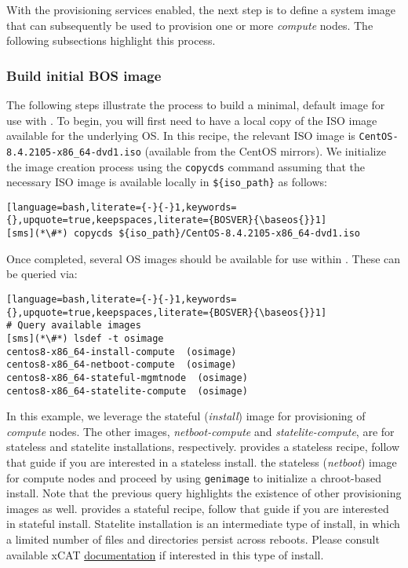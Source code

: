 
With the provisioning services enabled, the next step is to define
a system image that can subsequently be
used to provision one or more {\em compute} nodes. The following subsections highlight this process.

\subsubsection{Build initial BOS image} \label{sec:assemble_bos}
The following steps illustrate the process to build a minimal, default image for use with \xCAT{}. To begin, you will
first need to have a local copy of the ISO image available for the underlying OS. In this recipe, the relevant ISO image
is \texttt{CentOS-8.4.2105-x86\_64-dvd1.iso} (available from the CentOS mirrors). We initialize the image
creation process using the \texttt{copycds} command assuming that the necessary ISO image is available locally in
\texttt{\$\{iso\_path\}} as follows:

\begin{lstlisting}[language=bash,literate={-}{-}1,keywords={},upquote=true,keepspaces,literate={BOSVER}{\baseos{}}1]
[sms](*\#*) copycds ${iso_path}/CentOS-8.4.2105-x86_64-dvd1.iso
\end{lstlisting}

\noindent Once completed, several OS images should be available for use within \xCAT{}. These can be queried via:

\begin{lstlisting}[language=bash,literate={-}{-}1,keywords={},upquote=true,keepspaces,literate={BOSVER}{\baseos{}}1]
# Query available images
[sms](*\#*) lsdef -t osimage
centos8-x86_64-install-compute  (osimage)
centos8-x86_64-netboot-compute  (osimage)
centos8-x86_64-stateful-mgmtnode  (osimage)
centos8-x86_64-statelite-compute  (osimage)
\end{lstlisting}

In this example, we leverage
the stateful ({\em install}) image for provisioning of {\em
compute} nodes.  The other images, {\em
netboot-compute} and {\em statelite-compute}, are for stateless and statelite
installations, respectively. \OHPC{} provides a stateless \xCAT{} recipe,
follow that guide if you are interested in a stateless install.
\else
the stateless ({\em netboot}) image for compute nodes and proceed by using
\texttt{genimage} to initialize a chroot-based install. Note that the previous query highlights the existence of other
provisioning images as well. \OHPC{} provides a stateful \xCAT{} recipe,
follow that guide if you are interested in  stateful install.
\fi
Statelite installation is an intermediate type of install, in which a limited
number of files and directories persist across reboots.  Please consult
available xCAT \href{https://xcat-docs.readthedocs.io/en/stable/}{\color{blue}
documentation} if interested in this type of install.
